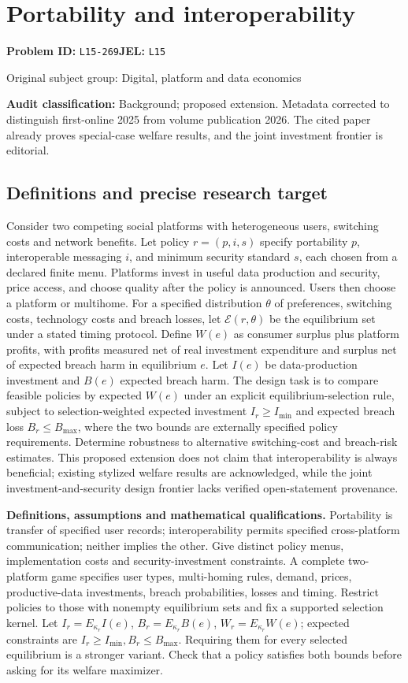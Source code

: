 \documentclass[11pt,a4paper]{article}
\begin{document}
\section*{Portability and interoperability}
\textbf{Problem ID:} \texttt{L15-269}\quad \textbf{JEL:} \texttt{L15}\par
\label{problem:OP-0409}
{\sffamily\small\color{muted}Original subject group: Digital, platform and data economics\par}
\label{definitions:problem:30007691}
\textbf{Audit classification:} Background; proposed extension. Metadata corrected to distinguish first-online 2025 from volume publication 2026. The cited paper already proves special-case welfare results, and the joint investment frontier is editorial.
\subsection*{Definitions and precise research target}
Consider two competing social platforms with heterogeneous users, switching costs and network benefits. Let policy \(r=(p,i,s)\) specify portability \(p\), interoperable messaging \(i\), and minimum security standard \(s\), each chosen from a declared finite menu. Platforms invest in useful data production and security, price access, and choose quality after the policy is announced. Users then choose a platform or multihome. For a specified distribution \(\theta\) of preferences, switching costs, technology costs and breach losses, let \(\mathcal E(r,\theta)\) be the equilibrium set under a stated timing protocol. Define \(W(e)\) as consumer surplus plus platform profits, with profits measured net of real investment expenditure and surplus net of expected breach harm in equilibrium \(e\). Let \(I(e)\) be data-production investment and \(B(e)\) expected breach harm. The design task is to compare feasible policies by expected \(W(e)\) under an explicit equilibrium-selection rule, subject to selection-weighted expected investment \(I_r\geq I_{\min}\) and expected breach loss \(B_r\leq B_{\max}\), where the two bounds are externally specified policy requirements. Determine robustness to alternative switching-cost and breach-risk estimates. This proposed extension does not claim that interoperability is always beneficial; existing stylized welfare results are acknowledged, while the joint investment-and-security design frontier lacks verified open-statement provenance.

\textbf{Definitions, assumptions and mathematical qualifications.} Portability is transfer of specified user records; interoperability permits specified cross-platform communication; neither implies the other. Give distinct policy menus, implementation costs and security-investment constraints. A complete two-platform game specifies user types, multi-homing rules, demand, prices, productive-data investments, breach probabilities, losses and timing. Restrict policies to those with nonempty equilibrium sets and fix a supported selection kernel. Let \(I_r=E_{\kappa_r}I(e)\), \(B_r=E_{\kappa_r}B(e)\), \(W_r=E_{\kappa_r}W(e)\); expected constraints are \(I_r\geq I_{\min},B_r\leq B_{\max}\). Requiring them for every selected equilibrium is a stronger variant. Check that a policy satisfies both bounds before asking for its welfare maximizer.
\end{document}
